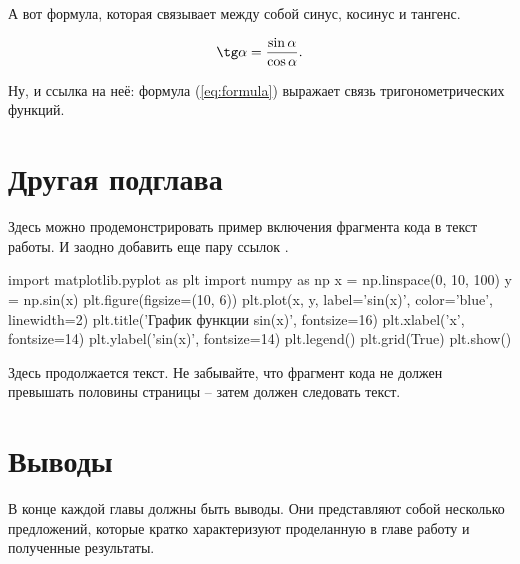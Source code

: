 А вот формула, которая связывает между собой синус, косинус и тангенс.

\begin{equation}
    \label{eq:formula}
    \tg \alpha = \frac{\sin \alpha}{\cos \alpha}.
\end{equation}

Ну, и ссылка на неё: формула (\ref{eq:formula}) выражает связь тригонометрических функций.

\vspace{\baselineskip}\section{Другая подглава}\vspace{\baselineskip}

Здесь можно продемонстрировать пример включения фрагмента кода в текст работы. И заодно добавить еще пару ссылок \cite{spark2022official, zaharia2021lakehouse}.
\begin{code}
import matplotlib.pyplot as plt
import numpy as np
x = np.linspace(0, 10, 100)
y = np.sin(x)
plt.figure(figsize=(10, 6))
plt.plot(x, y, label='sin(x)', color='blue', linewidth=2)
plt.title('График функции sin(x)', fontsize=16)
plt.xlabel('x', fontsize=14)
plt.ylabel('sin(x)', fontsize=14)
plt.legend()
plt.grid(True)
plt.show()    
\end{code}

Здесь продолжается текст. Не забывайте, что фрагмент кода не должен превышать половины страницы -- затем должен следовать текст.

\vspace{\baselineskip}\section{Выводы}\vspace{\baselineskip}

В конце каждой главы должны быть выводы. Они представляют собой несколько предложений, которые кратко характеризуют проделанную в главе работу и полученные результаты.
